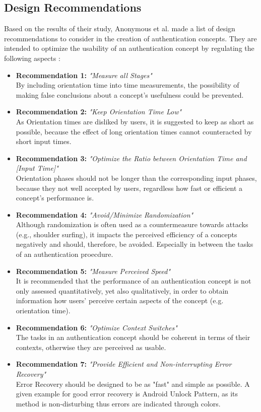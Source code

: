 \subsection{Design Recommendations} \label{3.2.2}

Based on the results of their study, Anonymous et al. \cite{anonymous} made a list of design recommendations to consider in the creation of authentication concepts. They are intended to optimize the usability of an authentication concept by regulating the following aspects \cite{anonymous}:

\begin{itemize}
    \item \textbf{Recommendation 1:} \textit{"Measure all Stages"}\\
    By including orientation time into time measurements, the possibility of making false conclusions about a concept's usefulness could be prevented.
    \item \textbf{Recommendation 2:} \textit{"Keep Orientation Time Low"}\\
    As Orientation times are disliked by users, it is suggested to keep as short as possible, because the effect of long orientation times cannot counteracted by short input times.
    \item \textbf{Recommendation 3:} \textit{"Optimize the Ratio between Orientation Time and [Input Time]"} \\
    Orientation phases should not be longer than the corresponding input phases, because they not well accepted by users, regardless how fast or efficient a concept's performance is.
    \item \textbf{Recommendation 4:} \textit{"Avoid/Minimize Randomization"}\\ 
    Although randomization is often used as a countermeasure towards attacks (e.g., shoulder surfing), it impacts the perceived efficiency of a concepts negatively and should, therefore, be avoided. Especially in between the tasks of an authentication proecdure.
    \item \textbf{Recommendation 5:} \textit{"Measure Perceived Speed"}\\
    It is recommended that the performance of an authentication concept is not only assessed quantitatively, yet also qualitatively, in order to obtain information how users' perceive certain aspects of the concept (e.g. orientation time).  
    \item \textbf{Recommendation 6:} \textit{"Optimize Context Switches"}\\
    The tasks in an authentication concept should be coherent in terms of their contexts, otherwise they are perceived as usable. 
    \item \textbf{Recommendation 7:} \textit{"Provide Efficient and Non-interrupting Error Recovery"}\\
    Error Recovery should be designed to be as "fast" and simple as possible. A given example for good error recovery is Android Unlock Pattern, as its method is non-disturbing thus errors are indicated through colors.  
    
    
\end{itemize}


